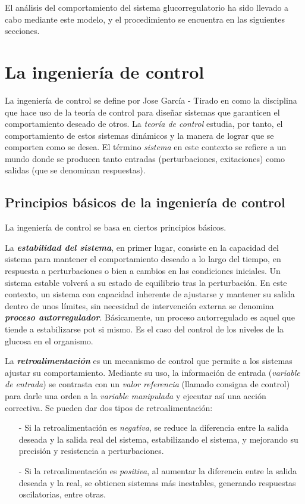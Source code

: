 El análisis del comportamiento del sistema glucorregulatorio ha sido llevado a cabo mediante este modelo, y el procedimiento se encuentra en las siguientes secciones.

\section{La ingeniería de control}

La ingeniería de control se define por Jose García - Tirado en \cite{tirado2016ingenieria} como la disciplina que hace uso de la teoría de control para diseñar sistemas que garanticen el comportamiento deseado de otros. La \textit{teoría de control} estudia, por tanto, el comportamiento de estos sistemas dinámicos y la manera de lograr que se comporten como se desea. El término \textit{sistema} en este contexto se refiere a un mundo donde se producen tanto entradas (perturbaciones, exitaciones) como salidas (que se denominan respuestas).

\subsection{Principios básicos de la ingeniería de control}

La ingeniería de control se basa en ciertos principios básicos. 

La \textit{\textbf{estabilidad del sistema}}, en primer lugar, consiste en la capacidad del sistema para mantener el comportamiento deseado a lo largo del tiempo, en respuesta a perturbaciones o bien a cambios en las condiciones iniciales. Un sistema estable volverá a su estado de equilibrio tras la perturbación. En este contexto, un sistema con capacidad inherente de ajustarse y mantener su salida dentro de unos límites, sin necesidad de intervención externa se denomina \textbf{\textit{proceso autorregulador}}. Básicamente, un proceso autorregulado es aquel que tiende a estabilizarse pot si mismo. Es el caso del control de los niveles de la glucosa en el organismo.

La \textit{\textbf{retroalimentación}} es un mecanismo de control que permite a los sistemas ajustar su comportamiento. Mediante su uso, la información de entrada (\textit{variable de entrada}) se contrasta con un \textit{valor referencia} (llamado consigna de control) para darle una orden a la \textit{variable manipulada} y ejecutar así una acción correctiva. Se pueden dar dos tipos de retroalimentación:
\begin{enumerate}
    \item[-] Si la retroalimentación es \textit{negativa}, se reduce la diferencia entre la salida deseada y la salida real del sistema, estabilizando el sistema, y mejorando su precisión y resistencia a perturbaciones.
    \item[-] Si la retroalimentación es \textit{positiva}, al aumentar la diferencia entre la salida deseada y la real, se obtienen sistemas más inestables, generando respuestas oscilatorias, entre otras. 
\end{enumerate}

